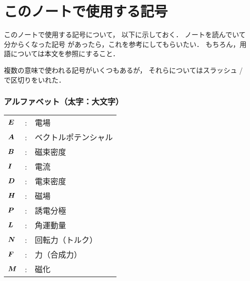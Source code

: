 \section*{このノートで使用する記号}
    このノートで使用する記号について，
    以下に示しておく．
    ノートを読んでいて分からくなった記号
    があったら，これを参考にしてもらいたい．
    もちろん，用語については本文を参照にすること．

    複数の意味で使われる記号がいくつもあるが，
    それらについてはスラッシュ / で区切りをいれた．


    \subsubsection*{アルファベット（太字：大文字）}
    \begin{tabular}{lll}
        $\boldsymbol{E}$                   &:  & 電場                                                                  \\
        $\boldsymbol{A}$                   &:  & ベクトルポテンシャル                                                  \\
        $\boldsymbol{B}$                   &:  & 磁束密度                                                              \\
        $\boldsymbol{I}$                   &:  & 電流                                                                  \\
        $\boldsymbol{D}$                   &:  & 電束密度                                                              \\
        $\boldsymbol{H}$                   &:  & 磁場                                                                  \\
        $\boldsymbol{P}$                   &:  & 誘電分極                                                              \\
        $\boldsymbol{L}$                   &:  & 角運動量                                                              \\
        $\boldsymbol{N}$                   &:  & 回転力（トルク）                                                      \\
        $\boldsymbol{F}$                   &:  & 力（合成力）                                                          \\
        $\boldsymbol{M}$                   &:  & 磁化                                                                  %
    \end{tabular}

